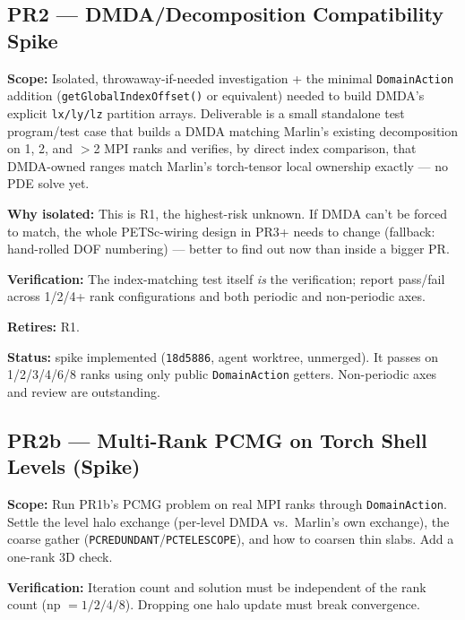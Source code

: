 \documentclass[11pt]{article}
\newcommand{\pr}[2]{\subsection{PR#1 --- #2}}
\newcommand{\status}[1]{\textcolor{marlinteal}{\textbf{Status:}} #1}
\begin{document}
\pr{2}{DMDA/Decomposition Compatibility Spike}
\textbf{Scope:} Isolated, throwaway-if-needed investigation + the minimal
\texttt{DomainAction} addition (\texttt{getGlobalIndexOffset()} or
equivalent) needed to build DMDA's explicit \texttt{lx/ly/lz} partition
arrays. Deliverable is a small standalone test program/test case that
builds a DMDA matching Marlin's existing decomposition on 1, 2, and
$>$2 MPI ranks and verifies, by direct index comparison, that DMDA-owned
ranges match Marlin's torch-tensor local ownership exactly --- no PDE solve
yet.

\textbf{Why isolated:} This is R1, the highest-risk unknown. If DMDA can't
be forced to match, the whole PETSc-wiring design in PR3+ needs to change
(fallback: hand-rolled DOF numbering) --- better to find out now than
inside a bigger PR.

\textbf{Verification:} The index-matching test itself \textit{is} the
verification; report pass/fail across 1/2/4+ rank configurations and both
periodic and non-periodic axes.

\textbf{Retires:} R1.

\status{spike implemented (\texttt{18d5886}, agent worktree, unmerged). It
passes on 1/2/3/4/6/8 ranks using only public \texttt{DomainAction} getters.
Non-periodic axes and review are outstanding.}

\pr{2b}{Multi-Rank PCMG on Torch Shell Levels (Spike)}
\textbf{Scope:} Run PR1b's PCMG problem on real MPI ranks through
\texttt{DomainAction}. Settle the level halo exchange (per-level DMDA
vs.\ Marlin's own exchange), the coarse gather
(\texttt{PCREDUNDANT}/\texttt{PCTELESCOPE}), and how to coarsen thin slabs.
Add a one-rank 3D check.

\textbf{Verification:} Iteration count and solution must be independent of
the rank count (np $=1/2/4/8$). Dropping one halo update must break
convergence.
\end{document}
